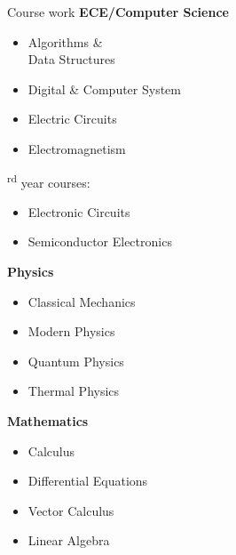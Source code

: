 \documentclass[hidelinks]{my_resume} %
\begin{document}
\begin{minipage}[t]{0.3\textwidth}
        \bigskip
        \begin{rSection}{Course work}
            \medskip
            \textbf{ECE/Computer Science}
            \begin{itemize}
                \item Algorithms \& \\ Data Structures
                \item Digital \& Computer System 
                \item Electric Circuits
                \item Electromagnetism 
            \end{itemize}
            \textsuperscript{rd} year courses:
            \begin{itemize}
                \item Electronic Circuits
                \item Semiconductor Electronics
            \end{itemize}

            \medskip
            \textbf{Physics}
            \begin{itemize}
                \item Classical Mechanics
                \item Modern Physics
                \item Quantum Physics
                \item Thermal Physics
            \end{itemize}
            \medskip
            \textbf{Mathematics}
            \begin{itemize}
                \item Calculus
                \item Differential Equations
                \item Vector Calculus
                \item Linear Algebra
            \end{itemize}
        \end{rSection}

             
    \end{minipage}
    \hspace{0.04\textwidth}
\end{document}
